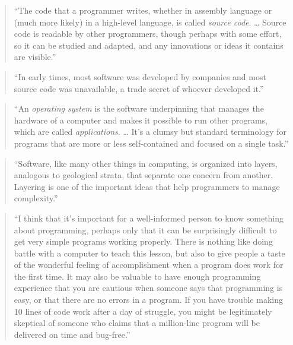 \documentclass[]{tufte-book}
\begin{document}
\begin{quote}
``The code that a programmer writes, whether in assembly language or (much more likely) in
a high-level language, is called \emph{source code}. \ldots{} Source code is readable by other programmers,
though perhaps with some effort, so it can be studied and adapted, and any innovations or ideas
it contains are visible.'' \citep{kernighan2011d}
\end{quote}

\begin{quote}
``In early times, most software was developed by companies and most source code was
unavailable, a trade secret of whoever developed it.'' \citep{kernighan2011d}
\end{quote}

\begin{quote}
``An \emph{operating system} is the software underpinning that manages the hardware of a
computer and makes it possible to run other programs, which are called \emph{applications}.
\ldots{} It's a clumsy but standard terminology for programs that are more or less self-contained
and focused on a single task.'' \citep{kernighan2011d}
\end{quote}

\begin{quote}
``Software, like many other things in computing, is organized into layers, analogous to
geological strata, that separate one concern from another. Layering is one of the important
ideas that help programmers to manage complexity.'' \citep{kernighan2011d}
\end{quote}

\begin{quote}
``I think that it's important for a well-informed person to know something about
programming, perhaps only that it can be surprisingly difficult to get very simple
programs working properly. There is nothing like doing battle with a computer to teach
this lesson, but also to give people a taste of the wonderful feeling of accomplishment
when a program does work for the first time. It may also be valuable to have enough
programming experience that you are cautious when someone says that programming is easy,
or that there are no errors in a program. If you have trouble making 10 lines of code
work after a day of struggle, you might be legitimately skeptical of someone who claims
that a million-line program will be delivered on time and bug-free.'' \citep{kernighan2011d}
\end{quote}
\end{document}
